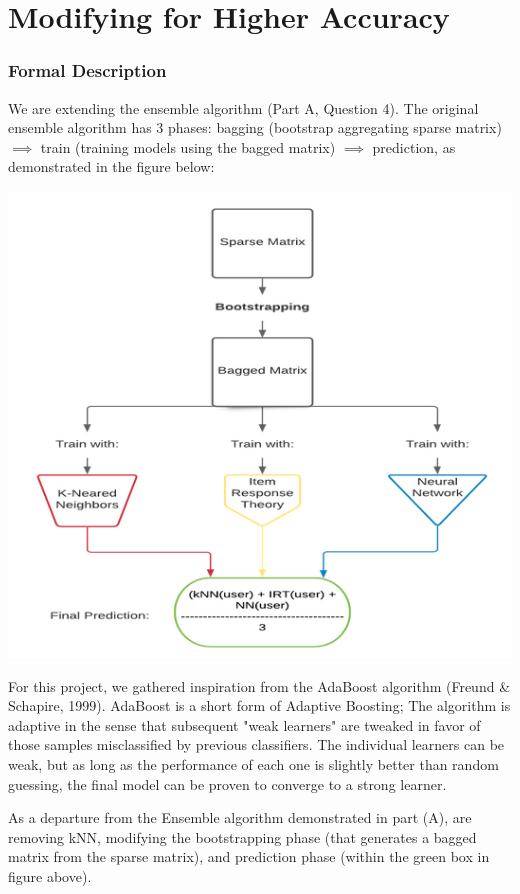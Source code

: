\documentclass{article}
\begin{document}
    

    \pagebreak

    \part{Modifying for Higher Accuracy}
    \section{Formal Description}
    We are extending the ensemble algorithm (Part A, Question 4). The original ensemble algorithm has 3 phases: bagging (bootstrap aggregating sparse matrix) $\implies$ train (training models using the bagged matrix) $\implies$ prediction, as demonstrated in the figure below:

    \includegraphics[scale=0.55]{figures/pb_f1.png}
    
    For this project, we gathered inspiration from the AdaBoost algorithm (Freund \& Schapire, 1999). AdaBoost is a short form of Adaptive Boosting; The algorithm is adaptive in the sense that subsequent "weak learners" are tweaked in favor of those samples misclassified by previous classifiers. The individual learners can be weak, but as long as the performance of each one is slightly better than random guessing, the final model can be proven to converge to a strong learner.
    
    As a departure from the Ensemble algorithm demonstrated in part (A), are removing kNN, modifying the bootstrapping phase (that generates a bagged matrix from the sparse matrix), and prediction phase (within the green box in figure above).
\end{document}
